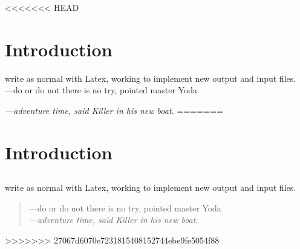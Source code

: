 <<<<<<< HEAD
\chapter{Introduction}
write as normal with Latex, working to implement new output and input files.\\
---do or do not there is no try, pointed master Yoda\par
\textit{---adventure time, said Killer in his new boat.}
=======
\chapter{Introduction} 
\section{} 
write as normal with Latex, working to implement new output and input files.
\begin{quote}
---do or do not there is no try, pointed master Yoda\\
\textit{---adventure time, said Killer in his new boat.}
\end{quote}
>>>>>>> 27067d6070e7231815408152744ebe9fe5054f88
